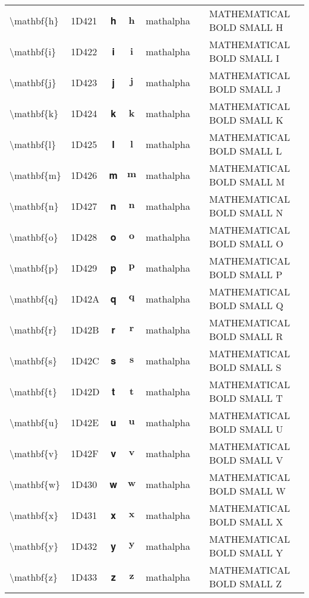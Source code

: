 \documentclass[a4paper,landscape]{article}
\begin{document}
\begin{longtable}{llcclll}
\textbackslash{}mathbf\{h\} & 1D421 & 𝐡 & $\mathbf{h}$ & mathalpha &  & MATHEMATICAL BOLD SMALL H \\
\textbackslash{}mathbf\{i\} & 1D422 & 𝐢 & $\mathbf{i}$ & mathalpha &  & MATHEMATICAL BOLD SMALL I \\
\textbackslash{}mathbf\{j\} & 1D423 & 𝐣 & $\mathbf{j}$ & mathalpha &  & MATHEMATICAL BOLD SMALL J \\
\textbackslash{}mathbf\{k\} & 1D424 & 𝐤 & $\mathbf{k}$ & mathalpha &  & MATHEMATICAL BOLD SMALL K \\
\textbackslash{}mathbf\{l\} & 1D425 & 𝐥 & $\mathbf{l}$ & mathalpha &  & MATHEMATICAL BOLD SMALL L \\
\textbackslash{}mathbf\{m\} & 1D426 & 𝐦 & $\mathbf{m}$ & mathalpha &  & MATHEMATICAL BOLD SMALL M \\
\textbackslash{}mathbf\{n\} & 1D427 & 𝐧 & $\mathbf{n}$ & mathalpha &  & MATHEMATICAL BOLD SMALL N \\
\textbackslash{}mathbf\{o\} & 1D428 & 𝐨 & $\mathbf{o}$ & mathalpha &  & MATHEMATICAL BOLD SMALL O \\
\textbackslash{}mathbf\{p\} & 1D429 & 𝐩 & $\mathbf{p}$ & mathalpha &  & MATHEMATICAL BOLD SMALL P \\
\textbackslash{}mathbf\{q\} & 1D42A & 𝐪 & $\mathbf{q}$ & mathalpha &  & MATHEMATICAL BOLD SMALL Q \\
\textbackslash{}mathbf\{r\} & 1D42B & 𝐫 & $\mathbf{r}$ & mathalpha &  & MATHEMATICAL BOLD SMALL R \\
\textbackslash{}mathbf\{s\} & 1D42C & 𝐬 & $\mathbf{s}$ & mathalpha &  & MATHEMATICAL BOLD SMALL S \\
\textbackslash{}mathbf\{t\} & 1D42D & 𝐭 & $\mathbf{t}$ & mathalpha &  & MATHEMATICAL BOLD SMALL T \\
\textbackslash{}mathbf\{u\} & 1D42E & 𝐮 & $\mathbf{u}$ & mathalpha &  & MATHEMATICAL BOLD SMALL U \\
\textbackslash{}mathbf\{v\} & 1D42F & 𝐯 & $\mathbf{v}$ & mathalpha &  & MATHEMATICAL BOLD SMALL V \\
\textbackslash{}mathbf\{w\} & 1D430 & 𝐰 & $\mathbf{w}$ & mathalpha &  & MATHEMATICAL BOLD SMALL W \\
\textbackslash{}mathbf\{x\} & 1D431 & 𝐱 & $\mathbf{x}$ & mathalpha &  & MATHEMATICAL BOLD SMALL X \\
\textbackslash{}mathbf\{y\} & 1D432 & 𝐲 & $\mathbf{y}$ & mathalpha &  & MATHEMATICAL BOLD SMALL Y \\
\textbackslash{}mathbf\{z\} & 1D433 & 𝐳 & $\mathbf{z}$ & mathalpha &  & MATHEMATICAL BOLD SMALL Z \\

\end{longtable}
\end{document}
